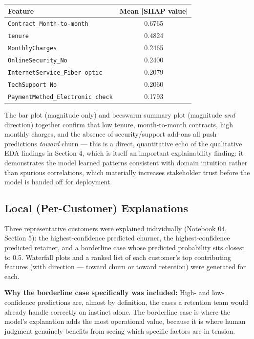 \documentclass[11pt]{article}
\begin{document}
\begin{center}
\begin{tabular}{lc}
\toprule
\textbf{Feature} & \textbf{Mean |SHAP value|} \\
\midrule
\texttt{Contract\_Month-to-month} & 0.6765 \\
\texttt{tenure} & 0.4824 \\
\texttt{MonthlyCharges} & 0.2465 \\
\texttt{OnlineSecurity\_No} & 0.2400 \\
\texttt{InternetService\_Fiber optic} & 0.2079 \\
\texttt{TechSupport\_No} & 0.2060 \\
\texttt{PaymentMethod\_Electronic check} & 0.1793 \\
\bottomrule
\end{tabular}
\end{center}

The bar plot (magnitude only) and beeswarm summary plot (magnitude \emph{and} direction) together confirm that low tenure, month-to-month contracts, high monthly charges, and the absence of security/support add-ons all push predictions \emph{toward} churn --- this is a direct, quantitative echo of the qualitative EDA findings in Section 4, which is itself an important explainability finding: it demonstrates the model learned patterns consistent with domain intuition rather than spurious correlations, which materially increases stakeholder trust before the model is handed off for deployment.

\subsection{Local (Per-Customer) Explanations}

Three representative customers were explained individually (Notebook 04, Section 5): the highest-confidence predicted churner, the highest-confidence predicted retainer, and a borderline case whose predicted probability sits closest to 0.5. Waterfall plots and a ranked list of each customer's top contributing features (with direction --- toward churn or toward retention) were generated for each.

\textbf{Why the borderline case specifically was included:} High- and low-confidence predictions are, almost by definition, the cases a retention team would already handle correctly on instinct alone. The borderline case is where the model's explanation adds the most operational value, because it is where human judgment genuinely benefits from seeing which specific factors are in tension.
\end{document}
